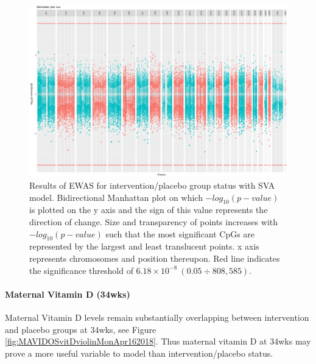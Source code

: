 \documentclass[
]{book}
\begin{document}
\begin{figure}

{\centering \includegraphics[width=0.8\linewidth]{figs/MAVIDOSccEPICewasManhattanSVA} 

}

\caption{Results of EWAS for intervention/placebo group status with SVA model. Bidirectional Manhattan plot on which \(-log_{10}(p-value)\) is plotted on the y axis and the sign of this value represents the direction of change. Size and transparency of points increases with \(-log_{10}(p-value)\) such that the most significant CpGs are represented by the largest and least translucent points. x axis represents chromosomes and position thereupon. Red line indicates the significance threshold of \(6.18\times10^{-8}~(0.05\div808,585)\).}\label{fig:MAVIDOSccEPICewasManhattanSVA}
\end{figure}



\hypertarget{maternal-vitamin-d-34wks}{%
\paragraph{Maternal Vitamin D (34wks)}\label{maternal-vitamin-d-34wks}}

Maternal Vitamin D levels remain substantially overlapping between intervention and placebo groups at 34wks, see Figure \ref{fig:MAVIDOSvitDviolinMonApr162018}.
Thus maternal vitamin D at 34wks may prove a more useful variable to model than intervention/placebo status.
\end{document}
